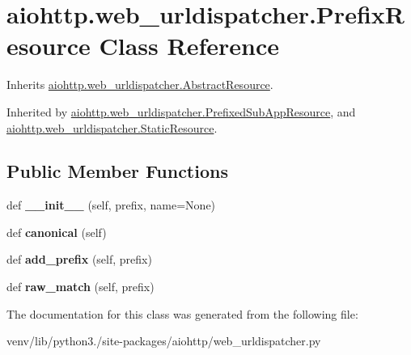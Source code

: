 \hypertarget{classaiohttp_1_1web__urldispatcher_1_1_prefix_resource}{}\section{aiohttp.\+web\+\_\+urldispatcher.\+Prefix\+Resource Class Reference}
\label{classaiohttp_1_1web__urldispatcher_1_1_prefix_resource}


Inherits \hyperlink{classaiohttp_1_1web__urldispatcher_1_1_abstract_resource}{aiohttp.\+web\+\_\+urldispatcher.\+Abstract\+Resource}.



Inherited by \hyperlink{classaiohttp_1_1web__urldispatcher_1_1_prefixed_sub_app_resource}{aiohttp.\+web\+\_\+urldispatcher.\+Prefixed\+Sub\+App\+Resource}, and \hyperlink{classaiohttp_1_1web__urldispatcher_1_1_static_resource}{aiohttp.\+web\+\_\+urldispatcher.\+Static\+Resource}.

\subsection*{Public Member Functions}
\begin{DoxyCompactItemize}
\item 
\mbox{\label{classaiohttp_1_1web__urldispatcher_1_1_prefix_resource_a87f4ab0eb0a69d0da82b88ce8e504e09}} 
def {\bfseries \+\_\+\+\_\+init\+\_\+\+\_\+} (self, prefix, name=None)
\item 
\mbox{\label{classaiohttp_1_1web__urldispatcher_1_1_prefix_resource_a1fc4c52196c80128e7091d2fffa5100b}} 
def {\bfseries canonical} (self)
\item 
\mbox{\label{classaiohttp_1_1web__urldispatcher_1_1_prefix_resource_a63eba56d5aaa0aa406e67afb0adfa713}} 
def {\bfseries add\+\_\+prefix} (self, prefix)
\item 
\mbox{\label{classaiohttp_1_1web__urldispatcher_1_1_prefix_resource_a456565a6e1f73466bb50ce7d99b7dc52}} 
def {\bfseries raw\+\_\+match} (self, prefix)
\end{DoxyCompactItemize}


The documentation for this class was generated from the following file\+:\begin{DoxyCompactItemize}
\item 
venv/lib/python3./site-\/packages/aiohttp/web\+\_\+urldispatcher.\+py\end{DoxyCompactItemize}
